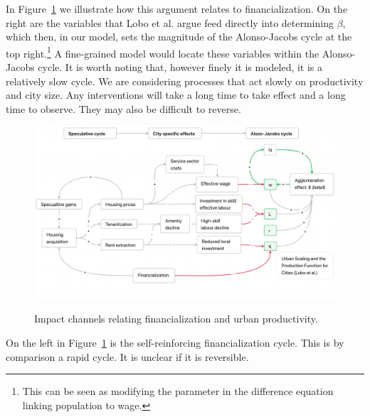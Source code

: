 In Figure~\ref{fig-impact-channels} we illustrate how this argument relates to financialization. On the right are the variables that Lobo et al. \cite{loboUrbanScalingProduction2013} argue feed directly into determining $\beta$, which then, in our model, sets the magnitude of the \gls{Alonso-Jacobs cycle} at the top right.\footnote{This can be seen as modifying the parameter in the difference equation linking population to wage.} A fine-grained model would locate these variables within the Alonso-Jacobs cycle. It is worth noting that, however finely it is modeled, it is a relatively slow cycle. We are considering processes that act slowly on productivity and city size. Any interventions will take a long time to take effect and a long time to observe. They may also be difficult to reverse. 

{\newpage\thispagestyle{empty}
\vspace{-1.5cm}
\begin{figure}
\vspace{-1cm}
\begin{adjustwidth}{-0.24\textwidth}{-0.24\textwidth}
\centering
\includegraphics[scale=.35, angle=90]{fig/impact-channels.png}
\label{fig-impact-channels}
\end{adjustwidth}
\caption{Impact channels relating financialization and urban productivity.}
\end{figure}
}
 
On the left in Figure~\ref{fig-impact-channels} is the self-reinforcing %
financialization cycle. This is by comparison a rapid cycle. It is unclear if it is reversible. 
 
